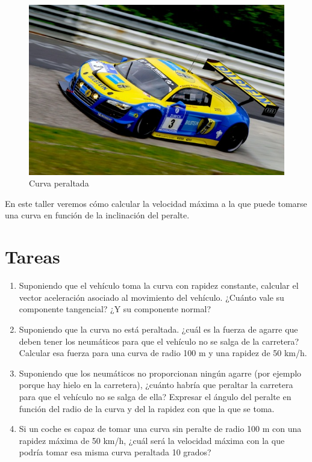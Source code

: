\documentclass[
  a4paper,
]{scrreport}
\begin{document}
\begin{figure}[H]

{\centering \includegraphics{img/peraltado/peralte.jpeg}

}

\caption{Curva peraltada}

\end{figure}%

En este taller veremos cómo calcular la velocidad máxima a la que puede
tomarse una curva en función de la inclinación del peralte.

\section{Tareas}\label{tareas-5}

\begin{enumerate}
\def\labelenumi{\arabic{enumi}.}
\item
  Suponiendo que el vehículo toma la curva con rapidez constante,
  calcular el vector aceleración asociado al movimiento del vehículo.
  ¿Cuánto vale su componente tangencial? ¿Y su componente normal?
\item
  Suponiendo que la curva no está peraltada. ¿cuál es la fuerza de
  agarre que deben tener los neumáticos para que el vehículo no se salga
  de la carretera? Calcular esa fuerza para una curva de radio 100 m y
  una rapidez de 50 km/h.
\item
  Suponiendo que los neumáticos no proporcionan ningún agarre (por
  ejemplo porque hay hielo en la carretera), ¿cuánto habría que peraltar
  la carretera para que el vehículo no se salga de ella? Expresar el
  ángulo del peralte en función del radio de la curva y del la rapidez
  con que la que se toma.
\item
  Si un coche es capaz de tomar una curva sin peralte de radio 100 m con
  una rapidez máxima de 50 km/h, ¿cuál será la velocidad máxima con la
  que podría tomar esa misma curva peraltada 10 grados?
\end{enumerate}
\end{document}
